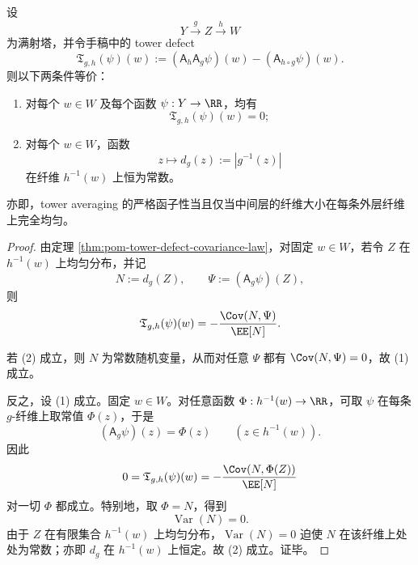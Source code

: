 \begin{theorem}\label{thm:conclusion-pom-tower-defect-vanishing-criterion}
设
\[
Y\xrightarrow{g} Z\xrightarrow{h} W
\]
为满射塔，并令手稿中的 tower defect
\[
\mathfrak T_{g,h}(\psi)(w):=(\mathsf A_h\mathsf A_g\psi)(w)-(\mathsf A_{h\circ g}\psi)(w).
\]
则以下两条件等价：
\begin{enumerate}
  \item 对每个 \(w\in W\) 及每个函数 \(\psi:Y\to\RR\)，均有
  \[
  \mathfrak T_{g,h}(\psi)(w)=0;
  \]
 \item 对每个 \(w\in W\)，函数
  \[
  z\longmapsto d_g(z):=|g^{-1}(z)|
  \]
  在纤维 \(h^{-1}(w)\) 上恒为常数。
\end{enumerate}
亦即，tower averaging 的严格函子性当且仅当中间层的纤维大小在每条外层纤维上完全均匀。
\end{theorem}
\begin{proof}
由定理 \ref{thm:pom-tower-defect-covariance-law}，对固定 \(w\in W\)，若令 \(Z\) 在 \(h^{-1}(w)\) 上均匀分布，并记
\[
N:=d_g(Z),
\qquad
\Psi:=(\mathsf A_g\psi)(Z),
\]
则
\[
\mathfrak T_{g,h}(\psi)(w)=-\frac{\Cov(N,\Psi)}{\EE[N]}.
\]

若 (2) 成立，则 \(N\) 为常数随机变量，从而对任意 \(\Psi\) 都有 \(\Cov(N,\Psi)=0\)，故 (1) 成立。

反之，设 (1) 成立。固定 \(w\in W\)。对任意函数 \(\Phi:h^{-1}(w)\to\RR\)，可取 \(\psi\) 在每条 \(g\)-纤维上取常值 \(\Phi(z)\)，于是
\[
(\mathsf A_g\psi)(z)=\Phi(z)
\qquad (z\in h^{-1}(w)).
\]
因此
\[
0=\mathfrak T_{g,h}(\psi)(w)=-\frac{\Cov(N,\Phi(Z))}{\EE[N]}
\]
对一切 \(\Phi\) 都成立。特别地，取 \(\Phi=N\)，得到
\[
\operatorname{Var}(N)=0.
\]
由于 \(Z\) 在有限集合 \(h^{-1}(w)\) 上均匀分布，\(\operatorname{Var}(N)=0\) 迫使 \(N\) 在该纤维上处处为常数；亦即 \(d_g\) 在 \(h^{-1}(w)\) 上恒定。故 (2) 成立。证毕。
\end{proof}

\endinput
